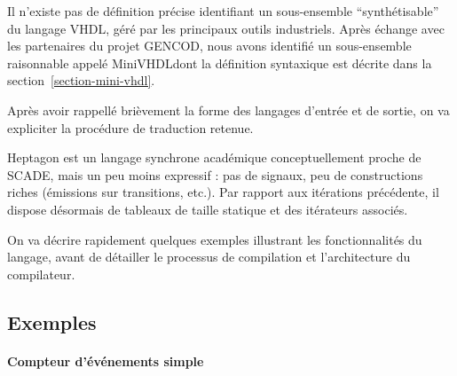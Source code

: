 \documentclass[a4paper]{article}
\newcommand{\LANG}{{\sc Heptagon}}
\newcommand{\minivhdl}{{\sc MiniVHDL}}
\begin{document}



Il n'existe pas de d\'efinition pr\'ecise identifiant un sous-ensemble
``synth\'etisable'' du langage VHDL, g\'er\'e par les principaux outils
industriels. Apr\`es \'echange avec les partenaires du projet GENCOD,
nous avons identifi\'e un sous-ensemble raisonnable appel\'e \minivhdl dont
la d\'efinition syntaxique est d\'ecrite dans la section~\ref{section-mini-vhdl}.

Apr\`es avoir rappell\'e bri\`evement la forme des langages d'entr\'ee et de sortie, on
va expliciter la proc\'edure de traduction retenue.

\LANG{} est un langage synchrone acad\'emique conceptuellement proche de SCADE,
mais un peu moins expressif : pas de signaux, peu de constructions riches
(\'emissions sur transitions, etc.). Par rapport aux it\'erations pr\'ec\'edente, il
dispose d\'esormais de tableaux de taille statique et des it\'erateurs associ\'es.

On va d\'ecrire rapidement quelques exemples illustrant les fonctionnalit\'es du
langage, avant de d\'etailler le processus de compilation et l'architecture du
compilateur.

\subsection{Exemples}

\paragraph{Compteur d'\'ev\'enements simple}
\end{document}
